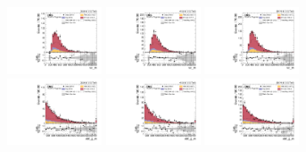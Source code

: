 \begin{figure}[!ht]
  \centering
  \includegraphics[width=0.25\textwidth]{analysis_plots/2016_zv/sr_l/vv_m.pdf} \hspace{-12pt}
  \includegraphics[width=0.25\textwidth]{analysis_plots/2017_zv/sr_l/vv_m.pdf} \hspace{-12pt}
  \includegraphics[width=0.25\textwidth]{analysis_plots/2018_zv/sr_l/vv_m.pdf} \hspace{-12pt} \\ \vspace{-5pt}
  \includegraphics[width=0.25\textwidth]{analysis_plots/2016_zv/sr_l/vbf_jj_m.pdf} \hspace{-12pt}
  \includegraphics[width=0.25\textwidth]{analysis_plots/2017_zv/sr_l/vbf_jj_m.pdf} \hspace{-12pt}
  \includegraphics[width=0.25\textwidth]{analysis_plots/2018_zv/sr_l/vbf_jj_m.pdf} \hspace{-12pt} \\ \vspace{-5pt}

\end{figure}
